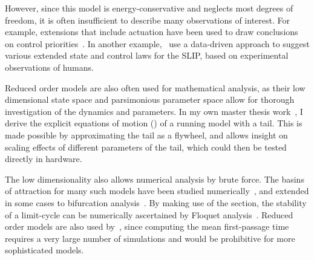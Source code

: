 However, since this model is energy-conservative and neglects most degrees of freedom, it is often insufficient to describe many observations of interest. For example, extensions that include actuation have been used to draw conclusions on control priorities~\cite{Birn-Jeffery3786,blum2014swing}. In another example,~\textcite{maus2015constructing} use a data-driven approach to suggest various extended state and control laws for the SLIP, based on experimental observations of humans. \par %
Reduced order models are also often used for mathematical analysis, as their low dimensional state space and parsimonious parameter space allow for thorough investigation of the dynamics and parameters.
In my own master thesis work~\cite{heim2016designing}, I derive the explicit equations of motion (\eom) of a running model with a tail. This is made possible by approximating the tail as a flywheel, and allows insight on scaling effects of different parameters of the tail, which could then be tested directly in hardware. \par
The low dimensionality also allows numerical analysis by brute force. The basins of attraction for many such models have been studied numerically~\cite{schwab2001basin,obayashi2016formation,cnops2015basin,rummel2008stable}, and extended in some cases to bifurcation analysis~\cite{aoi2006bifurcation,merker2015stable,gan2018all}. By making use of the \poincare section, the stability of a limit-cycle can be numerically ascertained by Floquet analysis~\cite{remy2011matlab}.
Reduced order models are also used by~\textcite{byl2009metastable}, since computing the mean first-passage time requires a very large number of simulations and would be prohibitive for more sophisticated models. \par



